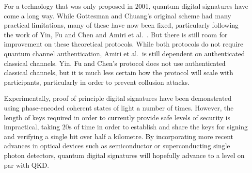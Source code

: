 \documentclass[%
 reprint,
 amsmath,amssymb,
 aps,
 pra,
]{revtex4-1}
\begin{document}
For a technology that was only proposed in 2001, quantum digital signatures have come a long way. While Gottesman and Chuang's original scheme \cite{quant-ph/0105032} had many practical limitations, many of these have now been fixed, particularly following the work of Yin, Fu and Chen \cite{PhysRevA.93.032316} and Amiri et al.\ \cite{PhysRevA.93.032325}. But there is still room for improvement on these theoretical protocols. While both protocols do not require quantum channel authentication, Amiri et al.\ is still dependent on authenticated classical channels. Yin, Fu and Chen's protocol does not use authenticated classical channels, but it is much less certain how the protocol will scale with participants, particularly in order to prevent collusion attacks.

Experimentally, proof of principle digital signatures have been demonstrated using phase-encoded coherent states of light a number of times. However, the length of keys required in order to currently provide safe levels of security is impractical, taking $20\text{s}$ of time in order to establish and share the keys for signing and verifying a single bit over half a kilometre. By incorporating more recent advances in optical devices such as semiconductor or superconducting single photon detectors, quantum digital signatures will hopefully advance to a level on par with QKD.


\appendix
\end{document}
